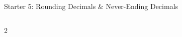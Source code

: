\documentclass{beamer}
\newcommand{\ealkey}[1]{\textcolor{ealkeycolour}{#1}}
\begin{document}
\begin{frame}{Starter 5: \ealkey{Rounding} \ealkey{Decimals} \& \ealkey{Never-Ending Decimals}}
\begin{columns}[T]
\begin{multicols}{2}
\begin{enumerate}
\end{enumerate}
\end{multicols}

\end{columns}

\end{frame}
\end{document}
